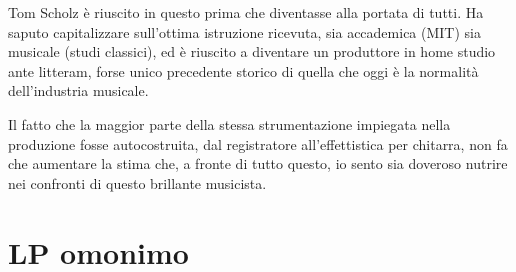 \documentclass[class=book, crop=false, oneside, 12pt]{standalone}
\begin{document}
Tom Scholz è riuscito in questo prima che diventasse alla portata di tutti. Ha saputo capitalizzare sull'ottima istruzione ricevuta, sia accademica (MIT) sia musicale (studi classici), ed è riuscito a diventare un produttore in home studio ante litteram, forse unico precedente storico di quella che oggi è la normalità dell'industria musicale. 

Il fatto che la maggior parte della stessa strumentazione impiegata nella produzione fosse autocostruita, dal registratore all'effettistica per chitarra, non fa che aumentare la stima che, a fronte di tutto questo, io sento sia doveroso nutrire nei confronti di questo brillante musicista. 

\section{LP omonimo}

\end{document}
